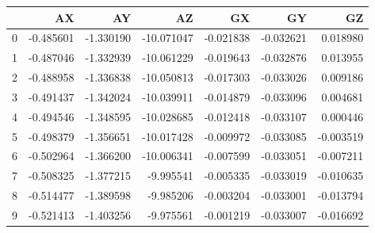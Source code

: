 \begin{tabular}{lrrrrrr}
\toprule
{} &        AX &        AY &         AZ &        GX &        GY &        GZ \\
\midrule
0 & -0.485601 & -1.330190 & -10.071047 & -0.021838 & -0.032621 &  0.018980 \\
1 & -0.487046 & -1.332939 & -10.061229 & -0.019643 & -0.032876 &  0.013955 \\
2 & -0.488958 & -1.336838 & -10.050813 & -0.017303 & -0.033026 &  0.009186 \\
3 & -0.491437 & -1.342024 & -10.039911 & -0.014879 & -0.033096 &  0.004681 \\
4 & -0.494546 & -1.348595 & -10.028685 & -0.012418 & -0.033107 &  0.000446 \\
5 & -0.498379 & -1.356651 & -10.017428 & -0.009972 & -0.033085 & -0.003519 \\
6 & -0.502964 & -1.366200 & -10.006341 & -0.007599 & -0.033051 & -0.007211 \\
7 & -0.508325 & -1.377215 &  -9.995541 & -0.005335 & -0.033019 & -0.010635 \\
8 & -0.514477 & -1.389598 &  -9.985206 & -0.003204 & -0.033001 & -0.013794 \\
9 & -0.521413 & -1.403256 &  -9.975561 & -0.001219 & -0.033007 & -0.016692 \\
\bottomrule
\end{tabular}
